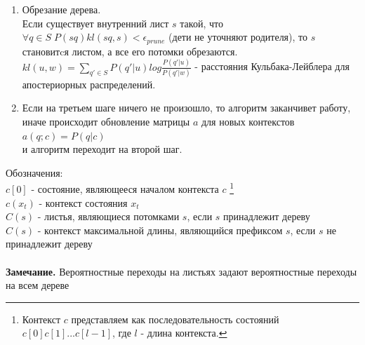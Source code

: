\documentclass{matmex-diploma-custom}
\begin{document}
{\begin{enumerate}
\begin{enumerate}
\\
$ \beta_{T}(c) = 1$, 
$ \beta_{t}(c) = \sum_{q \in S, c'=C(qc)}{a(q;c)b(y_{t+1}, c'[0])\beta_{t+1}(c')}$
\\
$p = P(Y|\Lambda) = \sum_{c \in C}\alpha_{T}(c)$
\\ 
$ \gamma_{t}(c) = \frac{\alpha_{t}(c)\beta_{t}(c)}{p}$
\\
$p(c) = \sum_{t}\gamma_{t}(c)$
\item Maximization
\\
$ \xi_{t}(q;c) = \frac{\alpha_{t}(c)a(q;c)b(y_{t+1},q)\beta_{t+1}(qc)}{p} $
\\
$ a(q; c) = \frac{\sum_{t}\xi_{t}(q,c)}{p(c)}$
\\
Пересчет $ B $ зависит от принятого семейства моделей испусканий и производится с помощью $ \gamma $ в точности также как и в алгоритме Baum-Welch.
\\
В случае распределения Пуассона
$b(.|c) ~ Poisson(\lambda_{c})$ 
\\
$ \lambda_{c} = \frac{\sum_{t}{\gamma_{t}(c)y_{t}}}{\sum_{t}{\gamma_{t}(c)}}$
\end{enumerate}
Пересчет EM проходит до тех пор пока разница правдоподобий между итерациями не будет меньше $ \epsilon_{EM}$
\\
\item Обрезание дерева.
\\
Если существует внутренний лист $ s $ такой, что $ \forall q \in S \; P(sq)kl(sq, s) < \epsilon_{prune} $ (дети не уточняют родителя), то $ s $ становитcя листом, а все его потомки обрезаются.
\\
$kl(u, w) = \sum_{q' \in S} P(q'|u) log\frac{P(q'|u)}{P(q'|w)}$ - расстояния Кульбака-Лейблера для апостериорных распределений.
\\
\item Если на третьем шаге ничего не произошло, то алгоритм заканчивет работу, 
иначе происходит обновление матрицы $ a $ для новых контекстов
\\
$ a(q; c) = P(q| c) $
\\
и алгоритм переходит на второй шаг.
\\
\end{enumerate}
Обозначения: 
\\
$ c[0] $ - состояние, являющееся началом контекста $ c $
\footnote{Контекст $ c $ представляем как последовательность состояний $c[0]c[1]...c[l-1]$, где $ l $ - длина контекста.}
\\
$ c(x_{t}) $ - контекст состояния $ x_{t} $ 
\\
$ C(s) $ - листья, являющиеся потомками $ s $, если $ s $ принадлежит дереву 
\\
$ C(s) $ - контекст максимальной длины, являющийся префиксом $ s $, если $ s $ не принадлежит дереву 
\\\\
\textbf{Замечание.}  Вероятностные переходы на листьях задают вероятностные переходы на всем дереве

}
\end{document}
